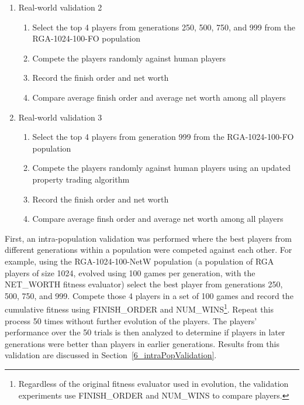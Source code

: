 \begin{enumerate}
\begin{enumerate}
  \end{enumerate}
  \item {Real-world validation 2}
  \begin{enumerate}
    \item {Select the top 4 players from generations 250, 500, 750, and 999 from
    the RGA-1024-100-FO population}
    \item {Compete the players randomly against human players}
    \item {Record the finish order and net worth}
    \item {Compare average finish order and average net worth among all players}
  \end {enumerate}
  \item {Real-world validation 3}
  \begin{enumerate}
    \item {Select the top 4 players from generation 999 from the RGA-1024-100-FO
    population}
    \item {Compete the players randomly against human players using an updated
    property trading algorithm}
    \item {Record the finish order and net worth}
    \item {Compare average finsh order and average net worth among all players}
  \end {enumerate}
\end{enumerate}

First, an intra-population validation was performed where the best players from
different generations within a population were competed against each other.
For example, using the RGA-1024-100-NetW population (a population of RGA players
of size 1024, evolved using 100 games per generation, with the NET\_WORTH
fitness evaluator) select the best player from generations 250, 500, 750, and
999. Compete those 4 players in a set of 100 games and record the cumulative
fitness using FINISH\_ORDER and NUM\_WINS\footnote{Regardless of the original
fitness evaluator used in evolution, the validation experiments use
FINISH\_ORDER and NUM\_WINS to compare players.}. Repeat this process 50 times
without further evolution of the players. The players' performance over the 50
trials is then analyzed to determine if players in later generations were better
than players in earlier generations. Results from this validation are discussed
in Section~\ref{6_intraPopValidation}.

